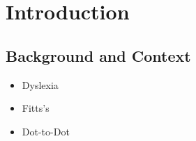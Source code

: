 \section{Introduction}
	\subsection{Background and Context}
		\begin{itemize}
			\item Dyslexia
			\item Fitts's
			\item Dot-to-Dot
		\end{itemize}